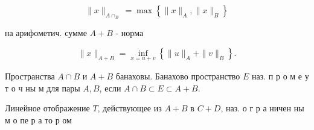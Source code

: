 \documentclass[10pt]{article}
\begin{document}
\[

\|x\|_{A \cap_{B}}=\max \left\{\|x\|_{A},\|x\|_{B}\right\}

\]



на арифометич. сумме $A+B$ - норма



\[

\|x\|_{A+B}=\inf _{x=u+v}\left\{\|u\|_{A}+\|v\|_{B}\right\} .

\]



Пространства $A \cap B$ и $A+B$ банаховы. Банахово пространство $E$ наз. п р о м е у т о ч ны м для пары $A, B$, если $A \cap B \subset E \subset A+B$.



Линейное отображение $T$, действующее из $A+B$ в $C+D$, наз. о г р а ничен ны м о пе р а то р ом
\end{document}
